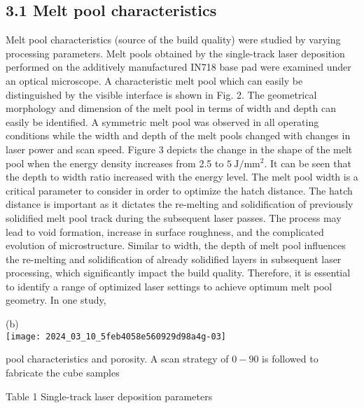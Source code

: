 \documentclass[10pt]{article}
\begin{document}
\subsection*{3.1 Melt pool characteristics}
Melt pool characteristics (source of the build quality) were studied by varying processing parameters. Melt pools obtained by the single-track laser deposition performed on the additively manufactured IN718 base pad were examined under an optical microscope. A characteristic melt pool which can easily be distinguished by the visible interface is shown in Fig. 2. The geometrical morphology and dimension of the melt pool in terms of width and depth can easily be identified. A symmetric melt pool was observed in all operating conditions while the width and depth of the melt pools changed with changes in laser power and scan speed. Figure 3 depicts the change in the shape of the melt pool when the energy density increases from 2.5 to $5 \mathrm{~J} / \mathrm{mm}^{2}$. It can be seen that the depth to width ratio increased with the energy level. The melt pool width is a critical parameter to consider in order to optimize the hatch distance. The hatch distance is important as it dictates the re-melting and solidification of previously solidified melt pool track during the subsequent laser passes. The process may lead to void formation, increase in surface roughness, and the complicated evolution of microstructure. Similar to width, the depth of melt pool influences the re-melting and solidification of already solidified layers in subsequent laser processing, which significantly impact the build quality. Therefore, it is essential to identify a range of optimized laser settings to achieve optimum melt pool geometry. In one study,

(b)\\
\texttt{[image: 2024\_03\_10\_5feb4058e560929d98a4g-03]}

pool characteristics and porosity. A scan strategy of $0-90$ is followed to fabricate the cube samples

Table 1 Single-track laser deposition parameters
\end{document}
